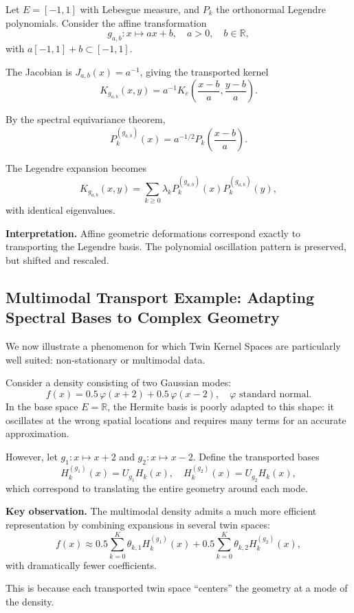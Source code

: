 \documentclass[11pt,a4paper]{article}
\newcommand{\R}{\mathbb{R}}
\begin{document}
Let $E = [-1, 1]$ with Lebesgue measure, and $P_k$ the orthonormal Legendre polynomials. Consider the affine transformation
\[
g_{a,b} : x \mapsto ax + b, \quad a > 0, \quad b \in \R,
\]
with $a[-1, 1] + b \subset [-1, 1]$.

The Jacobian is $J_{a,b}(x) = a^{-1}$, giving the transported kernel
\[
K_{g_{a,b}}(x, y) = a^{-1} K_e\left(\frac{x - b}{a}, \frac{y - b}{a}\right).
\]

By the spectral equivariance theorem,
\[
P_k^{(g_{a,b})}(x) = a^{-1/2} P_k\left(\frac{x - b}{a}\right).
\]

The Legendre expansion becomes
\[
K_{g_{a,b}}(x, y) = \sum_{k \geq 0} \lambda_k P_k^{(g_{a,b})}(x) P_k^{(g_{a,b})}(y),
\]
with identical eigenvalues.

\textbf{Interpretation.} Affine geometric deformations correspond exactly to transporting the Legendre basis. The polynomial oscillation pattern is preserved, but shifted and rescaled.

\subsection{Multimodal Transport Example: Adapting Spectral Bases to Complex Geometry}

We now illustrate a phenomenon for which Twin Kernel Spaces are particularly well suited: non-stationary or multimodal data.

Consider a density consisting of two Gaussian modes:
\[
f(x) = 0.5 \, \varphi(x + 2) + 0.5 \, \varphi(x - 2), \quad \varphi \text{ standard normal}.
\]
In the base space $E = \R$, the Hermite basis is poorly adapted to this shape: it oscillates at the wrong spatial locations and requires many terms for an accurate approximation.

However, let $g_1 : x \mapsto x + 2$ and $g_2 : x \mapsto x - 2$. Define the transported bases
\[
H_k^{(g_1)}(x) = U_{g_1} H_k(x), \quad H_k^{(g_2)}(x) = U_{g_2} H_k(x),
\]
which correspond to translating the entire geometry around each mode.

\textbf{Key observation.} The multimodal density admits a much more efficient representation by combining expansions in several twin spaces:
\[
f(x) \approx 0.5 \sum_{k=0}^{K} \theta_{k,1} H_k^{(g_1)}(x) + 0.5 \sum_{k=0}^{K} \theta_{k,2} H_k^{(g_2)}(x),
\]
with dramatically fewer coefficients.

This is because each transported twin space ``centers'' the geometry at a mode of the density.
\end{document}
